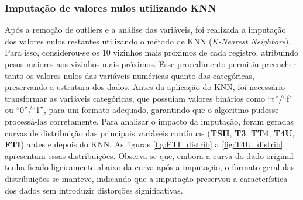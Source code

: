 \documentclass[11pt]{article}
\begin{document}
\subsubsection{Imputação de valores nulos utilizando KNN}

Após a remoção de outliers e a análise das variáveis, foi realizada a imputação dos valores nulos restantes utilizando o método de KNN (\textit{K-Nearest Neighbors}). Para isso, considerou-se os 10 vizinhos mais próximos de cada registro, atribuindo pesos maiores aos vizinhos mais próximos. Esse procedimento permitiu preencher tanto os valores nulos das variáveis numéricas quanto das categóricas, preservando a estrutura dos dados.
Antes da aplicação do KNN, foi necessário transformar as variáveis categóricas, que possuíam valores binários como ``t''/``f'' ou ``0''/``1'', para um formato adequado, garantindo que o algoritmo pudesse processá-las corretamente.
Para analisar o impacto da imputação, foram geradas curvas de distribuição das principais variáveis contínuas (\textbf{TSH}, \textbf{T3}, \textbf{TT4}, \textbf{T4U}, \textbf{FTI}) antes e depois do KNN. As figuras \ref{fig:FTI_distrib} a \ref{fig:T4U_distrib} apresentam essas distribuições. Observa-se que, embora a curva do dado original tenha ficado ligeiramente abaixo da curva após a imputação, o formato geral das distribuições se manteve, indicando que a imputação preservou a característica dos dados sem introduzir distorções significativas.
\end{document}
